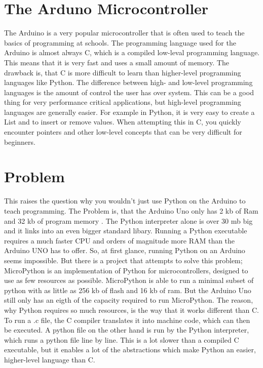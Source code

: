 \documentclass{article}
\begin{document}
\begin{multicols}{2}
\section{The Arduno Microcontroller}
The Arduino is a very popular microcontroller that is often used to teach the basics of programming at schools. The programming language used for the Arduino is almost always C, which is a compiled low-leval programming language. This means that it is very fast and uses a small amount of memory. The drawback is, that C is more difficult to learn than higher-level programming languages like Python. The difference between high- and low-level programming languages is the amount of control the user has over system. This can be a good thing for very performance critical applications, but high-level programming languages are generally easier. For example in Python, it is very easy to create a List and to insert or remove values. When attempting this in C, you quickly encounter pointers and other low-level concepts that can be very difficult for beginners.

\section{Problem}
This raises the question why you wouldn't just use Python on the Arduino to teach programming. The Problem is, that the Arduino Uno only has 2 kb of Ram and 32 kb of program memory \cite{Q1}. The Python interpreter alone is over 30 mb big and it links into an even bigger standard libary. Running a Python executable requires a much faster CPU and orders of magnitude more RAM than the Arduino UNO has to offer. So, at first glance, running Python on an Arduino seems impossible. But there is a project that attempts to solve this problem; MicroPython is an implementation of Python for microcontrollers, designed to use as few resources as possible. MicroPython is able to run a minimal subset of python with as little as 256 kb of flash and  16 kb of ram. But the Arduino Uno still only has an eigth of the capacity required to run MicroPython. The reason, why Python requires so much resources, is the way that it works different than C. To run a .c file, the C compiler translates it into machine code, which can then be executed. A python file on the other hand is run by the Python interpreter, which runs a python file line by line. This is a lot slower than a compiled C executable, but it enables a lot of the abstractions which make Python an easier, higher-level language than C.


\end{multicols}
\end{document}
